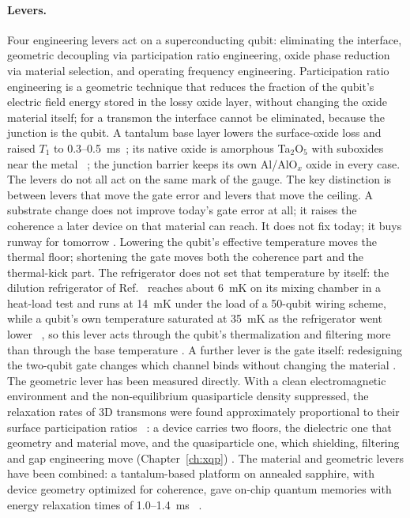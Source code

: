 \paragraph{Levers.} Four engineering levers act on a superconducting qubit: eliminating the interface, geometric decoupling via
participation ratio engineering, oxide phase reduction via material selection, and operating frequency engineering. Participation ratio
engineering is a geometric technique that reduces the fraction of the qubit's electric field energy stored in the lossy oxide layer,
without changing the oxide material itself; for a transmon the interface cannot be eliminated, because the junction is the qubit. A tantalum base layer lowers the surface-oxide
loss and raised $T_1$ to 0.3--0.5~ms~\cite{Place2021,Wang2022Ta}; its native oxide is amorphous Ta$_2$O$_5$ with suboxides near the
metal~\cite{Crowley2023} \observed; the junction barrier keeps its own Al/AlO$_x$ oxide in every case. The levers do not all act on the
same mark of the gauge. The key distinction is between levers that move the gate error and levers that move the ceiling. A substrate
change does not improve today's gate error at all; it raises the coherence a later device on that material can reach. It does not fix
today; it buys runway for tomorrow \interp.
Lowering the qubit's effective temperature moves the thermal floor; shortening the gate moves both the coherence part and the
thermal-kick part.
The refrigerator does not set that temperature by itself: the dilution refrigerator of Ref.~\cite{Krinner2019} reaches about 6~mK on its mixing chamber
in a heat-load test and runs at 14~mK under the load of a 50-qubit wiring scheme, while a qubit's own temperature saturated at 35~mK as the refrigerator went lower~\cite{Jin2015} \observed, so this lever acts
through the qubit's thermalization and filtering more than through the base temperature \interp. A further lever is the gate itself:
redesigning the two-qubit gate changes which channel binds without changing the material \interp. The geometric lever has been measured
directly. With a clean electromagnetic environment and the non-equilibrium quasiparticle density suppressed, the relaxation rates of 3D
transmons were found approximately proportional to their surface participation ratios~\cite{Wang2015TLS} \observed: a device carries two
floors, the dielectric one that geometry and material move, and the quasiparticle one, which shielding, filtering and gap engineering
move (Chapter~\ref{ch:xqp}) \interp. The material and geometric levers have been combined: a tantalum-based platform on annealed
sapphire, with device geometry optimized for coherence, gave on-chip quantum memories with energy relaxation times of
1.0--1.4~ms~\cite{Ganjam2024} \observed.

